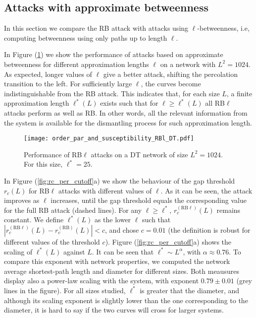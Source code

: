 \documentclass{article}
\begin{document}
\subsection{Attacks with approximate betweenness}

In this section we compare the RB attack with attacks using $\ell$-betweenness, i.e, computing betweenness using only paths up to length $\ell$. 

In Figure (\ref{fig:RBl_attacks}) we show the performance of attacks based on approximate betweenness for different approximation lengths $\ell$ on a network with $L^2 = 1024$. As expected, longer values of $\ell$ give a better attack, shifting the percolation transition to the left. For sufficiently large $\ell$, the curves become indistinguishable from the RB attack. This indicates that, for each size $L$, a finite approximation length $\ell^*(L)$ exists such that for $\ell \geq \ell^*(L)$ all RB$\ell$ attacks perform as well as RB. In other words, all the relevant information from the system is available for the dismantling process for such approximation length. 

\begin{figure}[h]
\centering
\texttt{[image: order\_par\_and\_susceptibility\_RBl\_DT.pdf]}
\caption{\label{fig:RBl_attacks} Performance of RB$\ell$ attacks on a DT network of size $L^2=1024$. For this size, $\ell^*=25$.}
\end{figure}

In Figure (\ref{fig:rc_per_cutoff}a) we show the behaviour of the gap threshold $r_c(L)$ for RB$\ell$ attacks with different values of $\ell$. As it can be seen, the attack improves as $\ell$ increases, until the gap threshold equals the corresponding value for the full RB attack (dashed lines). For any $\ell\geq \ell^*$, $r_c^{(\mathrm{RB}\ell)}(L)$ remains constant. We define $\ell^*(L)$ as the lower $\ell$ such that $|r_c^{(\mathrm{RB}\ell)}(L) - r_c^{(\mathrm{RB})}(L)| < c$, and chose $c = 0.01$ (the definition is robust for different values of the threshold $c$). 
Figure (\ref{fig:rc_per_cutoff}a) shows the scaling of $\ell^*(L)$ against $L$. It can be seen that $\ell^* \sim L^{\alpha}$, with $\alpha \approx 0.76$. To compare this exponent with network properties, we computed the network average shortest-path length and diameter for different sizes. Both meausures display also a power-law scaling with the system, with exponent $0.79\pm 0.01$ (grey lines in the figure). For all sizes studied, $\ell^*$ is greater that the diameter, and although its scaling exponent is slightly lower than the one corresponding to the diameter, it is hard to say if the two curves will cross for larger systems.  
\end{document}
